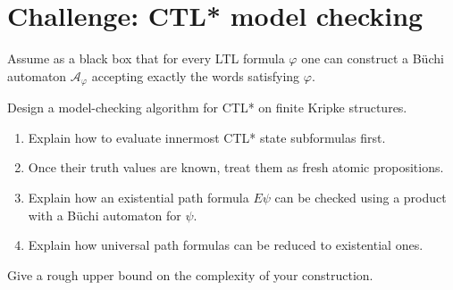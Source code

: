 \documentclass[11pt,a4paper]{tutorial}
\begin{document}
\begin{unfinished}
\begin{exercise}
\medskip
\noindent
\end{exercise}


\section{Challenge: CTL* model checking}

\begin{exercise}
Assume as a black box that for every LTL formula $\varphi$ one can construct
a B\"uchi automaton $\mathcal A_\varphi$ accepting exactly the words satisfying
$\varphi$.

Design a model-checking algorithm for CTL* on finite Kripke structures.

\begin{enumerate}[label=(\alph*)]
  \item Explain how to evaluate innermost CTL* state subformulas first.
  \item Once their truth values are known, treat them as fresh atomic propositions.
  \item Explain how an existential path formula $E\psi$ can be checked using a
        product with a B\"uchi automaton for $\psi$.
  \item Explain how universal path formulas can be reduced to existential ones.
\end{enumerate}

Give a rough upper bound on the complexity of your construction.
\end{exercise}

\end{unfinished}
\end{document}
